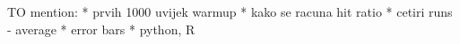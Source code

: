 TO mention:
* prvih 1000 uvijek warmup
* kako se racuna hit ratio
* cetiri runs - average
* error bars
* python, R
